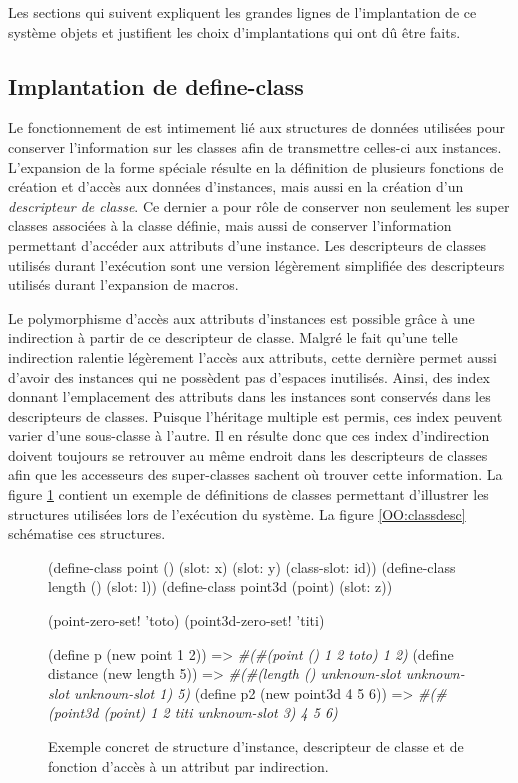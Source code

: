 \documentclass[12pt,twoside,letterpaper,francais]{book}
\newcommand{\scheme}[1]{\selectlanguage{english}{\tt #1}\selectlanguage{french}}
\newcommand{\schemeresult}[1]{{\it #1}}
\begin{document}
Les sections qui suivent expliquent les grandes lignes de
l'implantation de ce système objets et justifient les choix
d'implantations qui ont dû être faits.


\FloatBarrier
\subsection{Implantation de define-class}
Le fonctionnement de \scheme{define-class} est intimement lié aux
structures de données utilisées pour conserver l'information sur les
classes afin de transmettre celles-ci aux instances. L'expansion de la
forme spéciale \scheme{define-class} résulte en la définition de
plusieurs fonctions de création et d'accès aux données d'instances,
mais aussi en la création d'un \emph{descripteur de classe}. Ce
dernier a pour rôle de conserver non seulement les super classes
associées à la classe définie, mais aussi de conserver l'information
permettant d'accéder aux attributs d'une instance. Les descripteurs de
classes utilisés durant l'exécution sont une version légèrement
simplifiée des descripteurs utilisés durant l'expansion de macros.

Le polymorphisme d'accès aux attributs d'instances est possible grâce
à une indirection à partir de ce descripteur de classe. Malgré le fait
qu'une telle indirection ralentie légèrement l'accès aux attributs,
cette dernière permet aussi d'avoir des instances qui ne possèdent pas
d'espaces inutilisés. Ainsi, des index donnant l'emplacement des
attributs dans les instances sont conservés dans les descripteurs de
classes. Puisque l'héritage multiple est permis, ces index peuvent
varier d'une sous-classe à l'autre. Il en résulte donc que ces index
d'indirection doivent toujours se retrouver au même endroit dans les
descripteurs de classes afin que les accesseurs des super-classes
sachent où trouver cette information. La figure \ref{OO:obj-struct}
contient un exemple de définitions de classes permettant d'illustrer
les structures utilisées lors de l'exécution du système. La figure
\ref{OO:classdesc} schématise ces structures.

\begin{figure}[htb!]
  \begin{schemecode}
(define-class point () (slot: x) (slot: y) (class-slot: id))
(define-class length () (slot: l))
(define-class point3d (point) (slot: z))

(point-zero-set! 'toto)
(point3d-zero-set! 'titi)

(define p (new point 1 2))
   => \schemeresult{\#(\#(point () 1 2 toto) 1 2)}
(define distance (new length 5)) 
   => \schemeresult{\#(\#(length () unknown-slot unknown-slot unknown-slot 1) 5)}
(define p2 (new point3d 4 5 6))  
   => \schemeresult{\#(\#(point3d (point) 1 2 titi unknown-slot 3) 4 5 6)}
  \end{schemecode}
  \caption{Exemple concret de structure d'instance, descripteur de
    classe et de fonction d'accès à un attribut par indirection.}
  \label{OO:obj-struct}
\end{figure}
\end{document}

